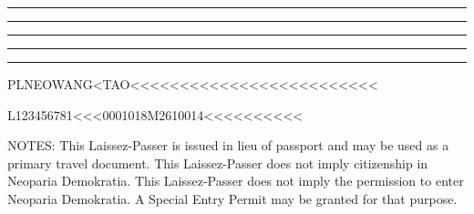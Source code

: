 






\begin{minipage}[b][106mm][t]{88mm}
	\parskip=7pt
	\par\vskip 5pt\hrule
	\par\vskip 5pt\hrule
	\par\vskip 5pt\hrule
	\par\vskip 5pt\hrule
	\par\vskip 5pt\hrule

	\vfill
	\parbox{\linewidth}{
		\fontsize{9pt}{9pt}\selectfont
		PLNEOWANG<TAO<<<<<<<<<<<<<<<<<<<<<<<<<\par\vskip 5pt
		L123456781<<<0001018M2610014<<<<<<<<<<
	}
\end{minipage}\hfill%
\par

\hfill%
\par





\vfill
\small
NOTES:
\inlinelistitem This Laissez-Passer is issued in lieu of passport and may be used as a primary travel document.
\inlinelistitem This Laissez-Passer does not imply citizenship in Neoparia Demokratia.
\inlinelistitem This Laissez-Passer does not imply the permission to enter Neoparia Demokratia. A Special Entry Permit may be granted for that purpose.



